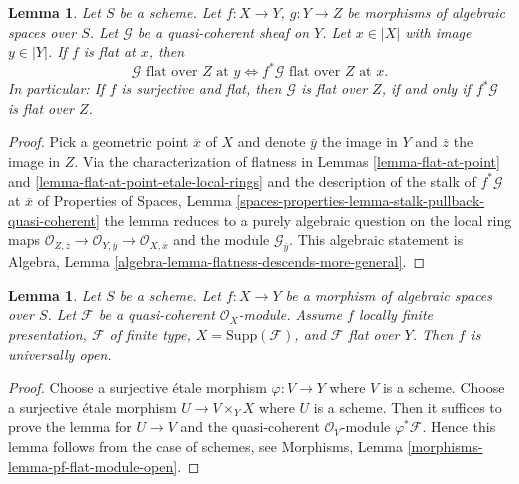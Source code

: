 \documentclass{stacks-project}
\theoremstyle{plain}
\newtheorem{lemma}[subsection]{Lemma}
\theoremstyle{definition}
\theoremstyle{remark}
\numberwithin{equation}{subsection}
\begin{document}
\begin{lemma}
\label{lemma-flat-permanence}
Let $S$ be a scheme. Let $f : X \to Y$, $g : Y \to Z$ be morphisms of
algebraic spaces over $S$. Let $\mathcal{G}$ be a quasi-coherent sheaf on $Y$.
Let $x \in |X|$ with image $y \in |Y|$.
If $f$ is flat at $x$, then
$$
\mathcal{G}\text{ flat over }Z\text{ at }y
\Leftrightarrow
f^*\mathcal{G}\text{ flat over }Z\text{ at }x.
$$
In particular: If $f$ is surjective and flat, then
$\mathcal{G}$ is flat over $Z$, if and only if
$f^*\mathcal{G}$ is flat over $Z$.
\end{lemma}

\begin{proof}
Pick a geometric point $\overline{x}$ of $X$ and denote
$\overline{y}$ the image in $Y$ and $\overline{z}$ the image in $Z$.
Via the characterization of flatness in
Lemmas \ref{lemma-flat-at-point} and
\ref{lemma-flat-at-point-etale-local-rings}
and the description of the stalk of $f^*\mathcal{G}$ at $\overline{x}$ of
Properties of Spaces,
Lemma \ref{spaces-properties-lemma-stalk-pullback-quasi-coherent}
the lemma reduces to a purely algebraic question on the local
ring maps
$\mathcal{O}_{Z, \overline{z}} \to \mathcal{O}_{Y, \overline{y}}
\to \mathcal{O}_{X, \overline{x}}$
and the module $\mathcal{G}_{\overline{y}}$.
This algebraic statement is
Algebra, Lemma \ref{algebra-lemma-flatness-descends-more-general}.
\end{proof}

\begin{lemma}
\label{lemma-pf-flat-module-open}
Let $S$ be a scheme.
Let $f : X \to Y$ be a morphism of algebraic spaces over $S$.
Let $\mathcal{F}$ be a quasi-coherent $\mathcal{O}_X$-module.
Assume $f$ locally finite presentation, $\mathcal{F}$ of
finite type, $X = \text{Supp}(\mathcal{F})$, and
$\mathcal{F}$ flat over $Y$. Then $f$ is universally open.
\end{lemma}

\begin{proof}
Choose a surjective \'etale morphism $\varphi : V \to Y$ where $V$ is a scheme.
Choose a surjective \'etale morphism $U \to V \times_Y X$ where $U$ is a scheme.
Then it suffices to prove the lemma for $U \to V$ and the quasi-coherent
$\mathcal{O}_V$-module $\varphi^*\mathcal{F}$.
Hence this lemma follows from the case of schemes, see
Morphisms, Lemma \ref{morphisms-lemma-pf-flat-module-open}.
\end{proof}
\end{document}
